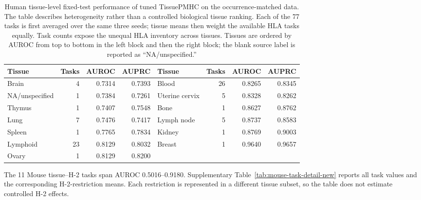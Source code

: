 \begin{table}[t]
\centering
\caption{Human tissue-level fixed-test performance of tuned TissuePMHC on the occurrence-matched data. The table describes heterogeneity rather than a controlled biological tissue ranking. Each of the 77 tasks is first averaged over the same three seeds; tissue means then weight the available HLA tasks equally. Task counts expose the unequal HLA inventory across tissues. Tissues are ordered by AUROC from top to bottom in the left block and then the right block; the blank source label is reported as ``NA/unspecified.''}
\label{tab:human-tissue-extremes}
\footnotesize
\begin{tabularx}{\textwidth}{>{\raggedright\arraybackslash}Xrrr>{\raggedright\arraybackslash}Xrrr}
\toprule
Tissue & Tasks & AUROC & AUPRC & Tissue & Tasks & AUROC & AUPRC \\
\midrule
Brain & 4 & 0.7314 & 0.7393 & Blood & 26 & 0.8265 & 0.8345 \\
NA/unspecified & 1 & 0.7384 & 0.7261 & Uterine cervix & 5 & 0.8328 & 0.8262 \\
Thymus & 1 & 0.7407 & 0.7548 & Bone & 1 & 0.8627 & 0.8762 \\
Lung & 7 & 0.7476 & 0.7417 & Lymph node & 5 & 0.8737 & 0.8583 \\
Spleen & 1 & 0.7765 & 0.7834 & Kidney & 1 & 0.8769 & 0.9003 \\
Lymphoid & 23 & 0.8129 & 0.8032 & Breast & 1 & 0.9640 & 0.9657 \\
Ovary & 1 & 0.8129 & 0.8200 & & & & \\
\bottomrule
\end{tabularx}
\end{table}

The 11 Mouse tissue--H-2 tasks span AUROC 0.5016--0.9180. Supplementary Table~\ref{tab:mouse-task-detail-new} reports all task values and the corresponding H-2-restriction means. Each restriction is represented in a different tissue subset, so the table does not estimate controlled H-2 effects.

